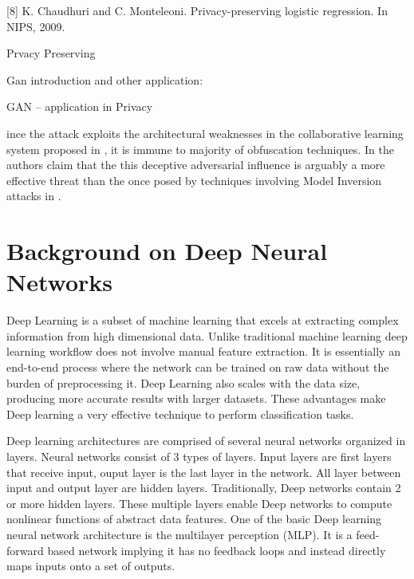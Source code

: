 \documentclass[conference]{IEEEtran}
\begin{document}
[8] K. Chaudhuri and C. Monteleoni. Privacy-preserving logistic
regression. In NIPS, 2009.


Prvacy Preserving
\cite{abadi2016deep}



Gan introduction and other application:


GAN -- application in Privacy


ince the attack \cite{hitaj2017deep} exploits the architectural weaknesses in the collaborative learning system proposed in \cite{abadi2016deep}, 
it is
immune to majority of obfuscation techniques.
In \cite{hitaj2017deep} the authors claim that the this deceptive adversarial influence is arguably a more
effective threat than the once posed by techniques involving Model Inversion attacks in \cite{deng2012mnist}.

\section{Background on Deep Neural Networks}
Deep Learning  is a subset of machine learning that excels at extracting complex information from high dimensional data. Unlike traditional machine learning deep learning workflow does not involve manual feature extraction. It is essentially an end-to-end process where the network can be trained on raw data without the burden of preprocessing it.
Deep Learning also scales with the data size, producing more accurate results with larger datasets.
These advantages make Deep learning a very effective technique to perform classification tasks.

Deep learning architectures are comprised of several neural networks organized in layers. Neural networks consist of 3 types of layers. Input layers are first layers that receive input, ouput layer is the last layer in the network. All layer between input and output layer are hidden layers. Traditionally, Deep networks contain 2 or more hidden layers. These multiple layers enable Deep networks to compute nonlinear functions of abstract data features.
One of the basic Deep learning neural network architecture is the multilayer perception (MLP). It is a feed-forward based network implying it has no feedback loops and instead directly maps inputs onto a set of outputs. 
\end{document}
